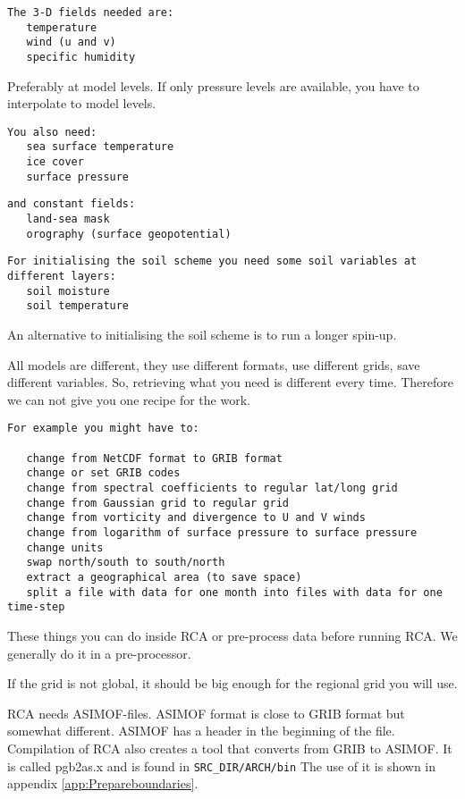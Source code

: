 \documentclass{article}
\begin{document}
\begin{verbatim}
The 3-D fields needed are:
   temperature
   wind (u and v)
   specific humidity
\end{verbatim}

Preferably at model levels.
If only pressure levels are available, you have to interpolate to model levels.

\begin{verbatim}
You also need:
   sea surface temperature
   ice cover
   surface pressure
\end{verbatim}

\begin{verbatim}
and constant fields:
   land-sea mask
   orography (surface geopotential)
\end{verbatim}

\begin{verbatim}
For initialising the soil scheme you need some soil variables at different layers:
   soil moisture
   soil temperature
\end{verbatim}

An alternative to initialising the soil scheme is to run a longer spin-up.

All models are different, they use different formats, use different grids,
save different variables. So, retrieving what you need is different every time.
Therefore we can not give you one recipe for the work.

\begin{verbatim}
For example you might have to:

   change from NetCDF format to GRIB format
   change or set GRIB codes
   change from spectral coefficients to regular lat/long grid
   change from Gaussian grid to regular grid
   change from vorticity and divergence to U and V winds
   change from logarithm of surface pressure to surface pressure
   change units
   swap north/south to south/north
   extract a geographical area (to save space)
   split a file with data for one month into files with data for one time-step
\end{verbatim}

These things you can do inside RCA or pre-process data before running RCA.
We generally do it in a pre-processor.

If the grid is not global, it should be big enough for the regional grid
you will use.

RCA needs ASIMOF-files. ASIMOF format is close to GRIB format
but somewhat different. ASIMOF has a header in the beginning of the file.
Compilation of RCA also creates a tool that converts from GRIB to ASIMOF.
It is called pgb2as.x and is found in \verb+SRC_DIR/ARCH/bin+
\newline
The use of it is shown in appendix \ref{app:Prepareboundaries}.
\end{document}
